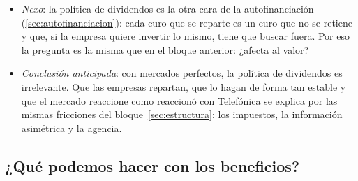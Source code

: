 \documentclass[11pt]{article}
\begin{document}
\begin{itemize}
\item \emph{Nexo}: la política de dividendos es la otra cara de la autofinanciación (\ref{sec:autofinanciacion}): cada euro que se reparte es un euro que no se retiene y que, si la empresa quiere invertir lo mismo, tiene que buscar fuera. Por eso la pregunta es la misma que en el bloque anterior: ¿afecta al valor?
\item \emph{Conclusión anticipada}: con mercados perfectos, la política de dividendos es irrelevante\nocite{MillerModigliani1961Dividend}. Que las empresas repartan, que lo hagan de forma tan estable y que el mercado reaccione como reaccionó con Telefónica se explica por las mismas fricciones del bloque~\ref{sec:estructura}: los impuestos, la información asimétrica y la agencia.
\end{itemize}

\subsection{¿Qué podemos hacer con los beneficios?}\label{sec:beneficios}
\end{document}

